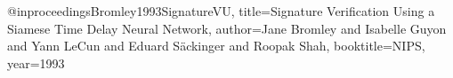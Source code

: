 @inproceedings{Bromley1993SignatureVU,
  title={Signature Verification Using a Siamese Time Delay Neural Network},
  author={Jane Bromley and Isabelle Guyon and Yann LeCun and Eduard S{\"a}ckinger and Roopak Shah},
  booktitle={NIPS},
  year={1993}
}